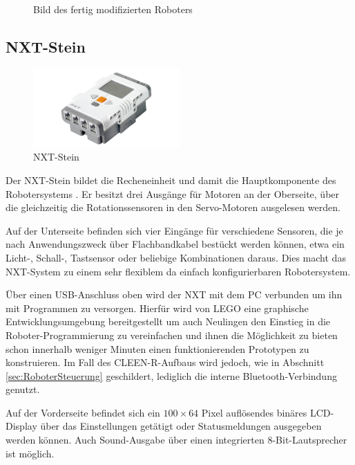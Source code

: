 \begin{figure}[h]
\centering
{}
\caption{Bild des fertig modifizierten Roboters}
\label{fig:unserRoboter}
\end{figure}

\subsection{NXT-Stein}
\label{subsec:Brick}
\begin{figure}[h]
\centering
\includegraphics[width=0.5\textwidth]{Bilder/Robot/nxt_brick}
\caption{NXT-Stein}
\label{fig:nxtBrick}
\end{figure}

Der NXT-Stein bildet die Recheneinheit und damit die Hauptkomponente des Robotersystems \cite{ranganathan2008use}. Er besitzt drei Ausgänge für Motoren an der Oberseite, über die gleichzeitig die Rotationssensoren in den Servo-Motoren ausgelesen werden.

Auf der Unterseite befinden sich vier Eingänge für verschiedene Sensoren, die je nach Anwendungszweck über Flachbandkabel bestückt werden können, etwa ein Licht-, Schall-, Tastsensor oder beliebige Kombinationen daraus. Dies macht das NXT-System zu einem sehr flexiblem da einfach konfigurierbaren Robotersystem.

Über einen USB-Anschluss oben wird der NXT mit dem PC verbunden um ihn mit Programmen zu versorgen. Hierfür wird von LEGO eine graphische Entwicklungsumgebung bereitgestellt um auch Neulingen den Einstieg in die Roboter-Programmierung zu vereinfachen und ihnen die Möglichkeit zu bieten schon innerhalb weniger Minuten einen funktionierenden Prototypen zu konstruieren. Im Fall des CLEEN-R-Aufbaus wird jedoch, wie in Abschnitt \ref{sec:RoboterSteuerung} geschildert, lediglich die interne Bluetooth-Verbindung genutzt.

Auf der Vorderseite befindet sich ein $100\times 64$ Pixel auflösendes binäres LCD-Display über das Einstellungen getätigt oder Statusmeldungen ausgegeben werden können. Auch Sound-Ausgabe über einen integrierten 8-Bit-Lautsprecher ist möglich.

